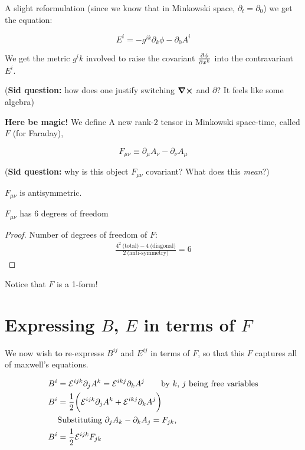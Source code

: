 A slight reformulation (since we know that in Minkowski space, $\partial_t = \partial_0$)
we get the equation:


\begin{equation}
    \boxed{ E^i = - g^{ik} \partial_k \phi - \partial_0 A^i}
\end{equation}

We get the metric $g^ik$ involved to raise the covariant $\pdv{\phi}{x^k}$
into the contravariant $E^i$.

(\textbf{Sid question:} how does one justify switching $\curl$ and $\partial$? It feels like some algebra)

\textbf{Here be magic!} We define A new rank-$2$ tensor in Minkowski space-time,
called $F$ (for Faraday),

\begin{equation}
    \boxed{F_{\mu \nu} \equiv \partial_\mu A_\nu - \partial_\nu A_\mu}
\end{equation}

(\textbf{Sid question:} why is this object $F_{\mu \nu}$ covariant? What does this \textit{mean}?)

\begin{lemma}
$F_{\mu \nu}$ is antisymmetric.
\end{lemma}

\begin{lemma}
$F_{\mu \nu}$ has 6 degrees of freedom
\end{lemma}
\begin{proof}
Number of degrees of freedom of $F$: 
\begin{align*}
\frac{4^2~\text{(total)} - 4~\text{(diagonal)}}{2~\text{(anti-symmetry)}} = 6
\end{align*}
\end{proof}

Notice that $F$ is a 1-form!

\section{Expressing $B$, $E$ in terms of $F$}
We now wish to re-expresss $B^{ij}$ and $E^{ij}$ in terms of $F$, so that
this $F$ captures all of maxwell's equations.

\begin{align*}
    B^i &= \mathcal{E}^{ijk}  \partial_j A^k = \mathcal{E}^{ikj} \partial_k A^j \tag*{by $k$, $j$ being free variables} \\
    B^i &= \frac{1}{2} \bigg( \mathcal{E}^{ijk} \partial_j A^k + \mathcal{E}^{ikj} \partial_k A^j \bigg) \\
        &\text{Substituting $\partial_j A_k - \partial_k A_j = F_{jk}$, } \\
    B^i &= \frac{1}{2} \mathcal{E}^{ijk} F_{jk}
\end{align*}


